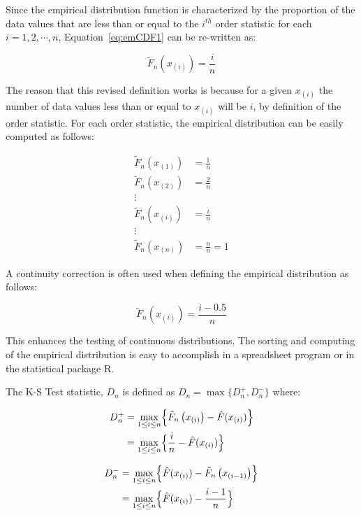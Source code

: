 \documentclass[
]{book}
\theoremstyle{definition}
\theoremstyle{definition}
\theoremstyle{definition}
\theoremstyle{definition}
\theoremstyle{remark}
\begin{document}
Since the empirical distribution function is characterized by the
proportion of the data values that are less than or equal to the
\(i^{th}\) order statistic for each \(i=1, 2, \cdots, n\),
Equation~\eqref{eq:emCDF1} can be re-written as:

\begin{equation}
\tilde{F}_{n} \left( x_{(i)} \right)  = \frac{i}{n}
\label{eq:emCDF12}
\end{equation}

The reason that this revised definition works is because for a given
\(x_{(i)}\) the number of data values less than or equal to \(x_{(i)}\) will
be \(i\), by definition of the order statistic. For each order statistic,
the empirical distribution can be easily computed as follows:

\[
\begin{aligned}
\tilde{F}_{n} \left( x_{(1)} \right) &  =  \frac{1}{n}\\
\tilde{F}_{n} \left( x_{(2)} \right) &  = \frac{2}{n}\\
 \vdots & \\
 \tilde{F}_{n} \left( x_{(i)} \right) &  = \frac{i}{n}\\
  \vdots    & \\
 \tilde{F}_{n} \left( x_{(n)} \right) &  = \frac{n}{n} = 1
\end{aligned}
\]

A continuity correction is often used when defining the empirical
distribution as follows:

\[\tilde{F}_{n} \left( x_{(i)} \right)  = \frac{i - 0.5}{n}\]

This enhances the testing of continuous distributions. The sorting and
computing of the empirical distribution is easy to accomplish in a
spreadsheet program or in the statistical package R.

The K-S Test statistic, \(D_{n}\) is defined as \(D_{n} = \max \lbrace D^{+}_{n}, D^{-}_{n} \rbrace\) where:

\[
\begin{aligned}
D^{+}_{n} & = \underset{1 \leq i \leq n}{\max} \Bigl\lbrace \tilde{F}_{n} \left( x_{(i)} \right) -  \hat{F}(x_{(i)}) \Bigr\rbrace \\
  & = \underset{1 \leq i \leq n}{\max} \Bigl\lbrace \frac{i}{n} -  \hat{F}(x_{(i)}) \Bigr\rbrace \end{aligned}
\]

\[
\begin{aligned}
D^{-}_{n} & = \underset{1 \leq i \leq n}{\max} \Bigl\lbrace \hat{F}(x_{(i)}) - \tilde{F}_{n} \left( x_{(i-1)} \right) \Bigr\rbrace \\
  & = \underset{1 \leq i \leq n}{\max} \Bigl\lbrace \hat{F}(x_{(i)}) - \frac{i-1}{n} \Bigr\rbrace
\end{aligned}
\]
\end{document}
